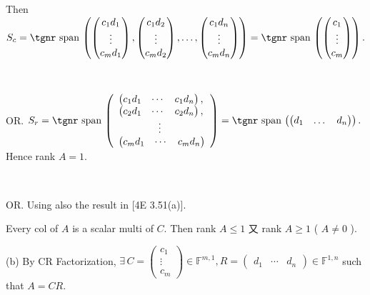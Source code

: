 \documentclass[a4paper, 11pt, UTF8]{article}
\def\Spn{{\textup{\tgnr span}}\,}
\def\Fbb{{\mathbb{F}}}
\def\Ha{{\large\Blind{(a) }}}
\def\Hb{{\large\Blind{(b) }}}
\def\Or{{\large O{\footnotesize R.} }}
\begin{document}
\begin{large}
Then $S_c=\Spn\left(\begin{pmatrix} c_1 d_1 \\ \vdots \\ c_m d_1\end{pmatrix},\begin{pmatrix} c_1 d_2 \\ \vdots \\ c_m d_2\end{pmatrix},\dots,\begin{pmatrix} c_1 d_n \\ \vdots \\ c_m d_n\end{pmatrix}\right)=\Spn\left(\begin{pmatrix} c_1 \\ \vdots \\ c_m\end{pmatrix}\right).$\par\,\par\quad\Ha
\Or $S_r=\Spn\left(\begin{array}{l}\begin{pmatrix} c_1 d_1 & \cdots & c_1 d_n\end{pmatrix},\\ \begin{pmatrix} c_2 d_1 & \cdots & c_2 d_n\end{pmatrix},\\ \qquad\qquad\vdots\\ \begin{pmatrix} c_m d_1 & \cdots & c_m d_n\end{pmatrix}\end{array}\right)=\Spn\left(\begin{pmatrix} d_1 & \dots & d_n\end{pmatrix}\right).$\quad Hence rank $A=1$.\par{\,}\par\quad\Ha
\Or {\Large\vspace{6pt}Using also the result in [4E 3.51(a)].}\par\quad\Ha
{\Large\vspace{6pt}Every col of $A$ is a scalar multi of $C.$ Then rank $A\leq 1$ 又 rank $A\geq 1$ ( $A\neq 0$ ).}\vspace{6pt}\par\quad
(b) By CR Factorization, $\exists\,C=\begin{pmatrix}c_1 \\ \vdots \\ c_m \end{pmatrix}\in\Fbb^{m,1},R=\begin{pmatrix} d_1 & \cdots & d_n\end{pmatrix}\in\Fbb^{1,n}$ such that $A=CR.$\vspace{4pt}\par\quad\Hb

\end{large}
\end{document}
